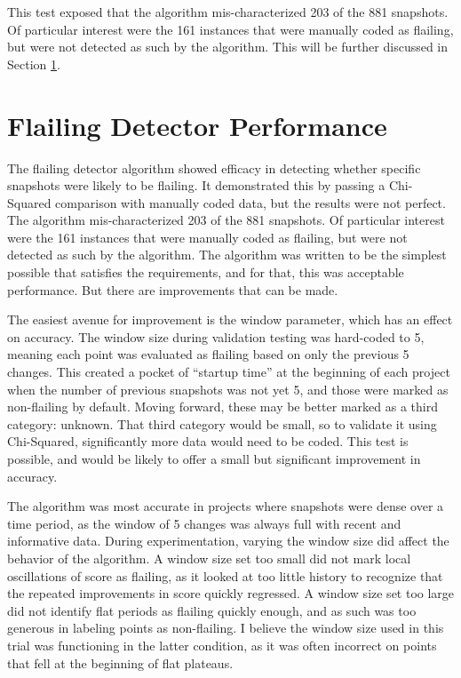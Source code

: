 This test exposed that the algorithm mis-characterized 203 of the 881 snapshots. Of particular interest were the 161 instances that were manually coded as flailing, but were not detected as such by the algorithm. This will be further discussed in Section \ref{sec:algorithm-discussion}.


\section{Flailing Detector Performance}
\label{sec:algorithm-discussion}
The flailing detector algorithm showed efficacy in detecting whether specific snapshots were likely to be flailing. It demonstrated this by passing a Chi-Squared comparison with manually coded data, but the results were not perfect. The algorithm mis-characterized 203 of the 881 snapshots. Of particular interest were the 161 instances that were manually coded as flailing, but were not detected as such by the algorithm. The algorithm was written to be the simplest possible that satisfies the requirements, and for that, this was acceptable performance. But there are improvements that can be made.

The easiest avenue for improvement is the window parameter, which has an effect on accuracy. The window size during validation testing was hard-coded to 5, meaning each point was evaluated as flailing based on only the previous 5 changes. This created a pocket of ``startup time'' at the beginning of each project when the number of previous snapshots was not yet 5, and those were marked as non-flailing by default. Moving forward, these may be better marked as a third category: unknown. That third category would be small, so to validate it using Chi-Squared, significantly more data would need to be coded. This test is possible, and would be likely to offer a small but significant improvement in accuracy.

The algorithm was most accurate in projects where snapshots were dense over a time period, as the window of 5 changes was always full with recent and informative data. During experimentation, varying the window size did affect the behavior of the algorithm. A window size set too small did not mark local oscillations of score as flailing, as it looked at too little history to recognize that the repeated improvements in score quickly regressed. A window size set too large did not identify flat periods as flailing quickly enough, and as such was too generous in labeling points as non-flailing. I believe the window size used in this trial was functioning in the latter condition, as it was often incorrect on points that fell at the beginning of flat plateaus. 


